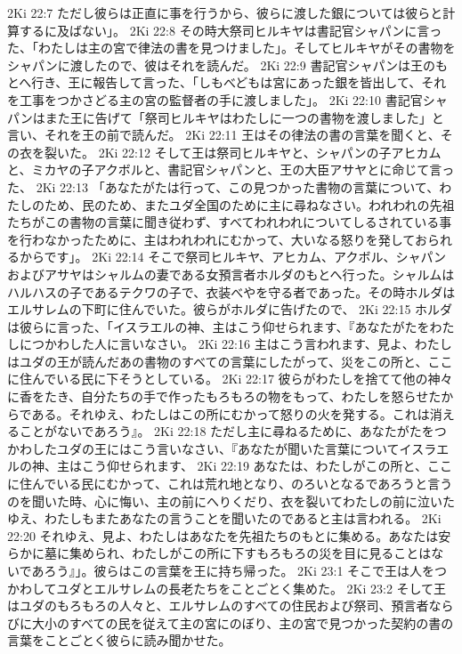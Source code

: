 2Ki 22:7  ただし彼らは正直に事を行うから、彼らに渡した銀については彼らと計算するに及ばない」。
2Ki 22:8  その時大祭司ヒルキヤは書記官シャパンに言った、「わたしは主の宮で律法の書を見つけました」。そしてヒルキヤがその書物をシャパンに渡したので、彼はそれを読んだ。
2Ki 22:9  書記官シャパンは王のもとへ行き、王に報告して言った、「しもべどもは宮にあった銀を皆出して、それを工事をつかさどる主の宮の監督者の手に渡しました」。
2Ki 22:10  書記官シャパンはまた王に告げて「祭司ヒルキヤはわたしに一つの書物を渡しました」と言い、それを王の前で読んだ。
2Ki 22:11  王はその律法の書の言葉を聞くと、その衣を裂いた。
2Ki 22:12  そして王は祭司ヒルキヤと、シャパンの子アヒカムと、ミカヤの子アクボルと、書記官シャパンと、王の大臣アサヤとに命じて言った、
2Ki 22:13  「あなたがたは行って、この見つかった書物の言葉について、わたしのため、民のため、またユダ全国のために主に尋ねなさい。われわれの先祖たちがこの書物の言葉に聞き従わず、すべてわれわれについてしるされている事を行わなかったために、主はわれわれにむかって、大いなる怒りを発しておられるからです」。
2Ki 22:14  そこで祭司ヒルキヤ、アヒカム、アクボル、シャパンおよびアサヤはシャルムの妻である女預言者ホルダのもとへ行った。シャルムはハルハスの子であるテクワの子で、衣装べやを守る者であった。その時ホルダはエルサレムの下町に住んでいた。彼らがホルダに告げたので、
2Ki 22:15  ホルダは彼らに言った、「イスラエルの神、主はこう仰せられます、『あなたがたをわたしにつかわした人に言いなさい。
2Ki 22:16  主はこう言われます、見よ、わたしはユダの王が読んだあの書物のすべての言葉にしたがって、災をこの所と、ここに住んでいる民に下そうとしている。
2Ki 22:17  彼らがわたしを捨てて他の神々に香をたき、自分たちの手で作ったもろもろの物をもって、わたしを怒らせたからである。それゆえ、わたしはこの所にむかって怒りの火を発する。これは消えることがないであろう』。
2Ki 22:18  ただし主に尋ねるために、あなたがたをつかわしたユダの王にはこう言いなさい、『あなたが聞いた言葉についてイスラエルの神、主はこう仰せられます、
2Ki 22:19  あなたは、わたしがこの所と、ここに住んでいる民にむかって、これは荒れ地となり、のろいとなるであろうと言うのを聞いた時、心に悔い、主の前にへりくだり、衣を裂いてわたしの前に泣いたゆえ、わたしもまたあなたの言うことを聞いたのであると主は言われる。
2Ki 22:20  それゆえ、見よ、わたしはあなたを先祖たちのもとに集める。あなたは安らかに墓に集められ、わたしがこの所に下すもろもろの災を目に見ることはないであろう』」。彼らはこの言葉を王に持ち帰った。
2Ki 23:1  そこで王は人をつかわしてユダとエルサレムの長老たちをことごとく集めた。
2Ki 23:2  そして王はユダのもろもろの人々と、エルサレムのすべての住民および祭司、預言者ならびに大小のすべての民を従えて主の宮にのぼり、主の宮で見つかった契約の書の言葉をことごとく彼らに読み聞かせた。
